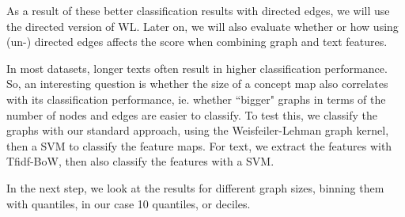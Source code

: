 As a result of these better classification results with directed edges, we will use the directed version of WL.
Later on, we will also evaluate whether or how using (un-) directed edges affects the score when combining graph and text features.



In most datasets, longer texts often result in higher classification performance.
So, an interesting question is whether the size of a concept map also correlates with its classification performance, ie. whether ``bigger" graphs in terms of the number of nodes and edges are easier to classify.
To test this, we classify the graphs with our standard approach, using the Weisfeiler-Lehman graph kernel, then a SVM to classify the feature maps.
For text, we extract the features with Tfidf-BoW, then also classify the features with a SVM.

\iffalse
In the next step, we look at the results for different graph sizes, binning them with quantiles, in our case 10 quantiles, or deciles.

